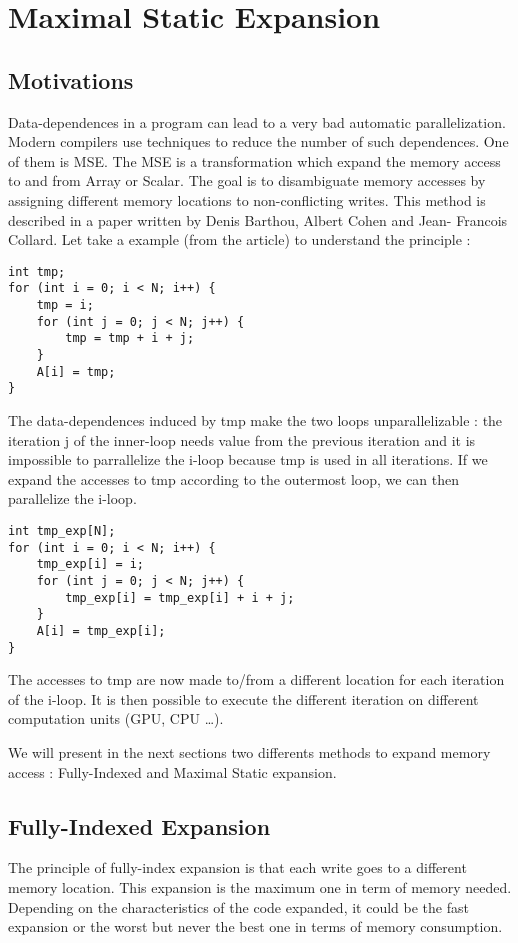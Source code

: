 \chapter{Maximal Static Expansion}\label{ch:MSE}

\section{Motivations}
Data-dependences in a program can lead to a very bad automatic parallelization. Modern compilers use techniques to reduce the number of such dependences. One of them is \ac{MSE}. The \ac{MSE} is a transformation which expand the memory access to and from Array or Scalar. The goal is to disambiguate memory accesses by assigning different memory locations to non-conflicting writes. This method is described in a paper written by Denis Barthou, Albert Cohen and Jean- Francois Collard\cite{MSE}. Let take a example (from the article) to understand the principle :
\begin{lstlisting}[frame=single]
int tmp;
for (int i = 0; i < N; i++) {
    tmp = i;
    for (int j = 0; j < N; j++) {
        tmp = tmp + i + j;
    }
    A[i] = tmp;
}
\end{lstlisting}

The data-dependences induced by tmp make the two loops unparallelizable : the iteration j of the inner-loop needs value from the previous iteration and it is impossible to parrallelize the i-loop because tmp is used in all iterations. If we expand the accesses to tmp according to the outermost loop, we can then parallelize the i-loop.

\begin{lstlisting}[frame=single]
int tmp_exp[N];
for (int i = 0; i < N; i++) {
    tmp_exp[i] = i;
    for (int j = 0; j < N; j++) {
        tmp_exp[i] = tmp_exp[i] + i + j;
    }
    A[i] = tmp_exp[i];
}
\end{lstlisting}

The accesses to tmp are now made to/from a different location for each iteration of the i-loop. It is then possible to execute the different iteration on different computation units (\ac{GPU}, \ac{CPU} …).

We will present in the next sections two differents methods to expand memory access : Fully-Indexed and Maximal Static expansion.

\section{Fully-Indexed Expansion}
The principle of fully-index expansion is that each write goes to a different memory location. This expansion is the maximum one in term of memory needed. Depending on the characteristics of the code expanded, it could be the fast expansion or the worst but never the best one in terms of memory consumption.

